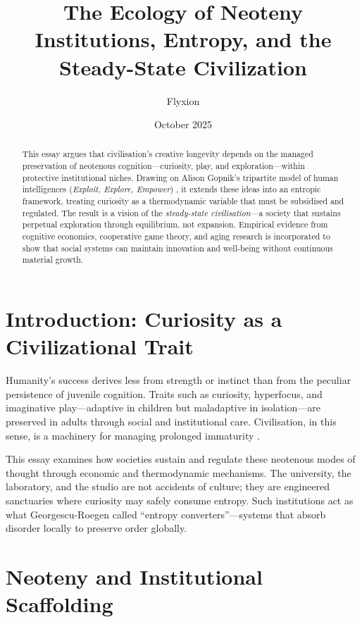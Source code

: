 \documentclass[12pt,a4paper]{article}
\title{\Huge\textbf{The Ecology of Neoteny}\\[0.5em]
       \Large Institutions, Entropy, and the Steady-State Civilization}
\author{Flyxion}
\date{October 2025}
\begin{document}
\maketitle

\begin{abstract}
This essay argues that civilisation’s creative longevity depends on the managed preservation 
of neotenous cognition---curiosity, play, and exploration---within protective institutional 
niches. Drawing on Alison Gopnik’s tripartite model of human intelligences 
(\emph{Exploit, Explore, Empower}) \citep{gopnik2025evolution,gopnik2016gardener},
it extends these ideas into an entropic framework, 
treating curiosity as a thermodynamic variable that must be subsidised and regulated. 
The result is a vision of the \emph{steady-state civilisation}---a society that sustains 
perpetual exploration through equilibrium, not expansion. 
Empirical evidence from cognitive economics, cooperative game theory, and aging research 
is incorporated to show that social systems can maintain innovation and well-being 
without continuous material growth.
\end{abstract}

\section{Introduction: Curiosity as a Civilizational Trait}

Humanity’s success derives less from strength or instinct than from 
the peculiar persistence of juvenile cognition. 
Traits such as curiosity, hyperfocus, and imaginative play---adaptive in children but 
maladaptive in isolation---are preserved in adults through social and institutional care.
Civilisation, in this sense, is a machinery for managing prolonged immaturity
\citep{gopnik2016gardener}.

This essay examines how societies sustain and regulate 
these neotenous modes of thought through economic and thermodynamic mechanisms. 
The university, the laboratory, and the studio are not accidents of culture; 
they are engineered sanctuaries where curiosity may safely consume entropy.
Such institutions act as 
what Georgescu-Roegen \citep{georgescu1971entropy} called ``entropy converters''---systems that 
absorb disorder locally to preserve order globally.

\section{Neoteny and Institutional Scaffolding}
\end{document}
